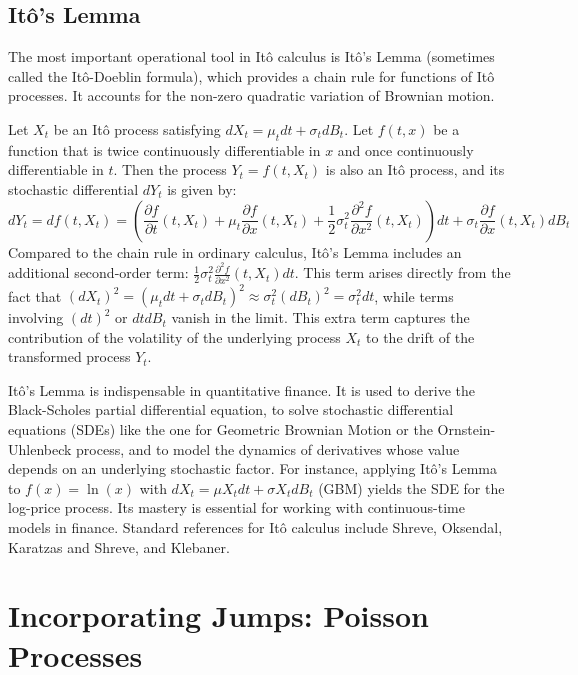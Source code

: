 \documentclass[11pt,twoside,openright]{report}
\begin{document}
\subsection{Itô's Lemma}
\label{subsec:ito_lemma}

The most important operational tool in Itô calculus is Itô's Lemma (sometimes called the Itô-Doeblin formula), which provides a chain rule for functions of Itô processes. It accounts for the non-zero quadratic variation of Brownian motion.

Let $X_t$ be an Itô process satisfying $dX_t = \mu_t dt + \sigma_t dB_t$. Let $f(t, x)$ be a function that is twice continuously differentiable in $x$ and once continuously differentiable in $t$. Then the process $Y_t = f(t, X_t)$ is also an Itô process, and its stochastic differential $dY_t$ is given by:
\[ dY_t = df(t, X_t) = \left( \frac{\partial f}{\partial t}(t, X_t) + \mu_t \frac{\partial f}{\partial x}(t, X_t) + \frac{1}{2} \sigma_t^2 \frac{\partial^2 f}{\partial x^2}(t, X_t) \right) dt + \sigma_t \frac{\partial f}{\partial x}(t, X_t) dB_t \]
Compared to the chain rule in ordinary calculus, Itô's Lemma includes an additional second-order term: $\frac{1}{2} \sigma_t^2 \frac{\partial^2 f}{\partial x^2}(t, X_t) dt$. This term arises directly from the fact that $(dX_t)^2 = (\mu_t dt + \sigma_t dB_t)^2 \approx \sigma_t^2 (dB_t)^2 = \sigma_t^2 dt$, while terms involving $(dt)^2$ or $dt dB_t$ vanish in the limit. This extra term captures the contribution of the volatility of the underlying process $X_t$ to the drift of the transformed process $Y_t$.

Itô's Lemma is indispensable in quantitative finance. It is used to derive the Black-Scholes partial differential equation, to solve stochastic differential equations (SDEs) like the one for Geometric Brownian Motion or the Ornstein-Uhlenbeck process, and to model the dynamics of derivatives whose value depends on an underlying stochastic factor. For instance, applying Itô's Lemma to $f(x) = \ln(x)$ with $dX_t = \mu X_t dt + \sigma X_t dB_t$ (GBM) yields the SDE for the log-price process. Its mastery is essential for working with continuous-time models in finance. Standard references for Itô calculus include Shreve, Oksendal, Karatzas and Shreve, and Klebaner.

\section{Incorporating Jumps: Poisson Processes}
\label{sec:poisson}
\end{document}

